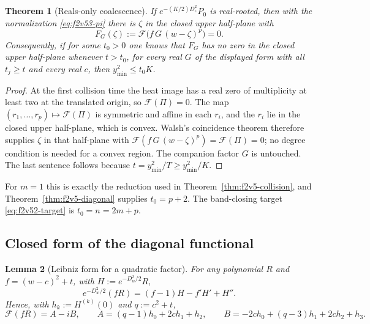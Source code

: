 \documentclass[11pt]{article}
\newtheorem{theorem}{Theorem}[section]
\newtheorem{lemma}[theorem]{Lemma}
\theoremstyle{definition}
\theoremstyle{remark}
\begin{document}
\begin{theorem}[Reals-only coalescence]
\label{thm:f2v53-reduction}
If \(e^{-(K/2)D_z^2}P_0\) is real-rooted, then with the normalization
\eqref{eq:f2v53-pi} there is \(\zeta\) in the closed upper half-plane with
\begin{equation}
 F_G(\zeta):=\mathcal F\bigl(f\,G\,(w-\zeta)^p\bigr)=0 .
 \label{eq:f2v53-diag}
\end{equation}
Consequently, if for some \(t_0>0\) one knows that \(F_G\) has no zero
in the closed upper half-plane whenever \(t>t_0\), for every real
\(G\) of the displayed form with all \(t_j\ge t\) and every real \(c\),
then \(y_{\min}^2\le t_0K\).
\end{theorem}

\begin{proof}
At the first collision time the heat image has a real zero of
multiplicity at least two at the translated origin, so
\(\mathcal F(\Pi)=0\).  The map \((r_1,\ldots,r_p)\mapsto\mathcal F(\Pi)\)
is symmetric and affine in each \(r_i\), and the \(r_i\) lie in the
closed upper half-plane, which is convex.  Walsh's coincidence theorem
therefore supplies \(\zeta\) in that half-plane with
\(\mathcal F(f\,G\,(w-\zeta)^p)=\mathcal F(\Pi)=0\); no degree condition is
needed for a convex region.  The companion factor \(G\) is untouched.
The last sentence follows because \(t=y_{\min}^2/T\ge y_{\min}^2/K\).
\end{proof}

For \(m=1\) this is exactly the reduction used in
Theorem~\ref{thm:f2v5-collision}, and Theorem~\ref{thm:f2v5-diagonal}
supplies \(t_0=p+2\).  The band-closing target
\eqref{eq:f2v52-target} is \(t_0=n=2m+p\).

\subsection{Closed form of the diagonal functional}

\begin{lemma}[Leibniz form for a quadratic factor]
\label{lem:f2v53-leibniz}
For any polynomial \(R\) and \(f=(w-c)^2+t\), with
\(H:=e^{-D_w^2/2}R\),
\begin{equation}
 e^{-D_w^2/2}(fR)=(f-1)H-f'H'+H''.
 \label{eq:f2v53-leibniz}
\end{equation}
Hence, with \(h_k:=H^{(k)}(0)\) and \(q:=c^2+t\),
\begin{equation}
 \mathcal F(fR)=A-iB,\qquad
 A=(q-1)h_0+2ch_1+h_2,\qquad
 B=-2ch_0+(q-3)h_1+2ch_2+h_3 .
 \label{eq:f2v53-AB}
\end{equation}
\end{lemma}
\end{document}
